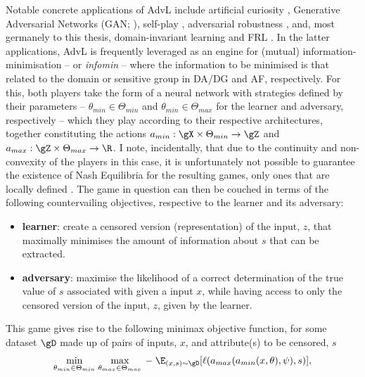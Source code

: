 Notable concrete applications of \ac{AdvL} include artificial curiosity
\citep{schmidhuber1992learning}, Generative Adversarial Networks (\ac{GAN};
\citealp{goodfellow14generative}), self-play \citep{silver2018general}, adversarial robustness
\citep{szegedy2013intriguing}, and, most germanely to this thesis, domain-invariant learning
\citep{ganin2016domain, zhao2019learning} and \ac{FRL} \citep{edwards2015censoring,
madras2018learning}.
%
%
In the latter applications, \ac{AdvL} is frequently leveraged as an engine for
(mutual) information-minimisation -- or \emph{infomin} -- where the information to be minimised is that
related to the domain or sensitive group in \ac{DA}/\ac{DG} and \ac{AF}, respectively.
%
For this, both players take the form of a neural network with strategies defined by their
parameters -- \(\theta_{min} \in \Theta_{min}\) and \(\theta_{min} \in \Theta_{max}\) for the
learner and adversary, respectively -- which they play according to their respective architectures,
together constituting the actions \(a_{min}: \gX \times \Theta_{min} \to \gZ \) and \(a_{max}: \gZ
\times \Theta_{max} \to \R \).
%
I note, incidentally, that due to the continuity and non-convexity of the players in this case, it
is unfortunately not possible to guarantee the existence of Nash Equilibria for the resulting
games, only ones that are locally defined \citep{unterthiner2018coulomb}.
%
The game in question can then be couched in terms of the following countervailing objectives,
respective to the learner and its adversary:
%
\begin{itemize}
  \item 
    \textbf{learner}: create a censored version (representation) of the input, \(z\), that
    maximally minimises the amount of information about \(s\) that can be extracted.
  \item 
    \textbf{adversary}: maximise the likelihood of a correct determination of the true value of
    \(s\) associated with given a input \(x\), while having access to only the censored version of
    the input, \(z\), given by the learner.
\end{itemize}
%
This game gives rise to the following minimax objective function, for some dataset \(\gD\)
made up of pairs of inputs, \(x\), and attribute(s) to be censored, \(s\)
%
\begin{align}
  \underset{\theta_{min} \in \Theta_{min}}{\text{min}}\; \underset{\theta_{max} \in
  \Theta_{max}}{\text{max}}\,
%
-\E_{(x, s) \sim \gD} [ \ell(a_{max}( a_{min}(x, \theta), \psi ), s ) ],
%
\label{eq:adv-infomin}
\end{align}
